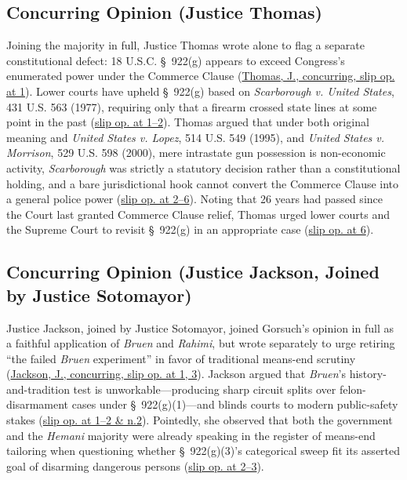 \documentclass[12pt]{article}
\begin{document}
\subsection{Concurring Opinion (Justice Thomas)}

Joining the majority in full, Justice Thomas wrote alone to flag a separate constitutional defect: 18 U.S.C. \S~922(g) appears to exceed Congress's enumerated power under the Commerce Clause (\href{https://supreme.justia.com/cases/federal/us/608/24-1234/}{Thomas, J., concurring, slip op. at 1}). Lower courts have upheld \S~922(g) based on \textit{Scarborough v. United States}, 431 U.S. 563 (1977), requiring only that a firearm crossed state lines at some point in the past (\href{https://supreme.justia.com/cases/federal/us/608/24-1234/}{slip op. at 1--2}). Thomas argued that under both original meaning and \textit{United States v. Lopez}, 514 U.S. 549 (1995), and \textit{United States v. Morrison}, 529 U.S. 598 (2000), mere intrastate gun possession is non-economic activity, \textit{Scarborough} was strictly a statutory decision rather than a constitutional holding, and a bare jurisdictional hook cannot convert the Commerce Clause into a general police power (\href{https://supreme.justia.com/cases/federal/us/608/24-1234/}{slip op. at 2--6}). Noting that 26 years had passed since the Court last granted Commerce Clause relief, Thomas urged lower courts and the Supreme Court to revisit \S~922(g) in an appropriate case (\href{https://supreme.justia.com/cases/federal/us/608/24-1234/}{slip op. at 6}).

\subsection{Concurring Opinion (Justice Jackson, Joined by Justice Sotomayor)}

Justice Jackson, joined by Justice Sotomayor, joined Gorsuch's opinion in full as a faithful application of \textit{Bruen} and \textit{Rahimi}, but wrote separately to urge retiring ``the failed \textit{Bruen} experiment'' in favor of traditional means-end scrutiny (\href{https://supreme.justia.com/cases/federal/us/608/24-1234/}{Jackson, J., concurring, slip op. at 1, 3}). Jackson argued that \textit{Bruen}'s history-and-tradition test is unworkable---producing sharp circuit splits over felon-disarmament cases under \S~922(g)(1)---and blinds courts to modern public-safety stakes (\href{https://supreme.justia.com/cases/federal/us/608/24-1234/}{slip op. at 1--2 \& n.2}). Pointedly, she observed that both the government and the \textit{Hemani} majority were already speaking in the register of means-end tailoring when questioning whether \S~922(g)(3)'s categorical sweep fit its asserted goal of disarming dangerous persons (\href{https://supreme.justia.com/cases/federal/us/608/24-1234/}{slip op. at 2--3}).
\end{document}
